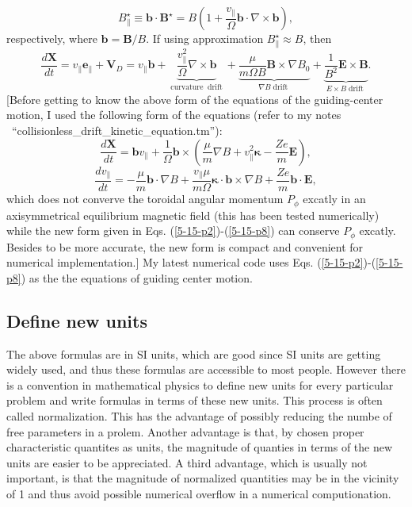 \documentclass{article}
\newcommand{\tmop}[1]{\ensuremath{\operatorname{#1}}}
\begin{document}
\begin{equation}
  \label{5-15-p8} B^{\star}_{\parallel} \equiv \mathbf{b} \cdot
  \mathbf{B}^{\star} = B \left( 1 + \frac{v_{\parallel}}{\Omega} \mathbf{b}
  \cdot \nabla \times \mathbf{b} \right),
\end{equation}
respectively, where $\mathbf{b}=\mathbf{B}/ B$. If using approximation
$B_{\parallel}^{\star} \approx B$, then
\begin{equation}
  \frac{d\mathbf{X}}{d t} = v_{\parallel} \mathbf{e}_{\parallel} +\mathbf{V}_D
  = v_{\parallel} \mathbf{b}+ \underbrace{\frac{v_{\parallel}^2}{\Omega}
  \nabla \times \mathbf{b}}_{\tmop{curvature} \tmop{drift}} +
  \underbrace{\frac{\mu}{m \Omega B} \mathbf{B} \times \nabla B_0}_{\nabla B
  \tmop{drift}} + \underbrace{\frac{1}{B^2} \mathbf{E} \times \mathbf{B}}_{E
  \times B \tmop{drift}} .
\end{equation}
[Before getting to know the above form of the equations of the guiding-center
motion, I used the following form of the equations (refer to my notes \
``collisionless\_drift\_kinetic\_equation.tm''):
\begin{equation}
  \frac{d\mathbf{X}}{d t} =\mathbf{b}v_{\parallel} + \frac{1}{\Omega}
  \mathbf{b} \times \left( \frac{\mu}{m} \nabla B + v_{\parallel}^2
  \mathbf{\kappa}- \frac{Z e}{m} \mathbf{E} \right),
\end{equation}
\begin{equation}
  \frac{d v_{\parallel}}{d t} = - \frac{\mu}{m} \mathbf{b} \cdot \nabla B +
  \frac{v_{\parallel} \mu}{m \Omega} \mathbf{\kappa} \cdot \mathbf{b} \times
  \nabla B + \frac{Z e}{m} \mathbf{b} \cdot \mathbf{E},
\end{equation}
which does not converve the toroidal angular momentum $P_{\phi}$ excatly in an
axisymmetrical equilibrium magnetic field (this has been tested numerically)
while the new form given in Eqs. (\ref{5-15-p2})-(\ref{5-15-p8}) can conserve
$P_{\phi}$ excatly. Besides to be more accurate, the new form is compact and
convenient for numerical implementation.] My latest numerical code uses Eqs.
(\ref{5-15-p2})-(\ref{5-15-p8}) as the the equations of guiding center motion.

\subsection{\label{5-17-1}Define new units}

The above formulas are in SI units, which are good since SI units are getting
widely used, and thus these formulas are accessible to most people. However
there is a convention in mathematical physics to define new units for every
particular problem and write formulas in terms of these new units. This
process is often called normalization. This has the advantage of possibly
reducing the numbe of free parameters in a prolem. Another advantage is that,
by chosen proper characteristic quantites as units, the magnitude of quanties
in terms of the new units are easier to be appreciated. A third advantage,
which is usually not important, is that the magnitude of normalized quantities
may be in the vicinity of 1 and thus avoid possible numerical overflow in a
numerical computionation.
\end{document}
